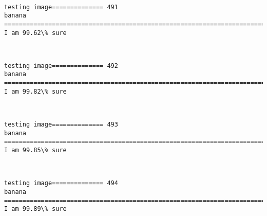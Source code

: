 \documentclass[11pt]{article}
\begin{document}
    \begin{center}
    \end{center}
    { \hspace*{\fill} \\}
    
    \begin{Verbatim}[commandchars=\\\{\}]
testing image============== 491
banana
============================================================================
I am 99.62\% sure

    \end{Verbatim}

    \begin{center}
    \end{center}
    { \hspace*{\fill} \\}
    
    \begin{Verbatim}[commandchars=\\\{\}]
testing image============== 492
banana
============================================================================
I am 99.82\% sure

    \end{Verbatim}

    \begin{center}
    \end{center}
    { \hspace*{\fill} \\}
    
    \begin{Verbatim}[commandchars=\\\{\}]
testing image============== 493
banana
============================================================================
I am 99.85\% sure

    \end{Verbatim}

    \begin{center}
    \end{center}
    { \hspace*{\fill} \\}
    
    \begin{Verbatim}[commandchars=\\\{\}]
testing image============== 494
banana
============================================================================
I am 99.89\% sure

    \end{Verbatim}
\end{document}

